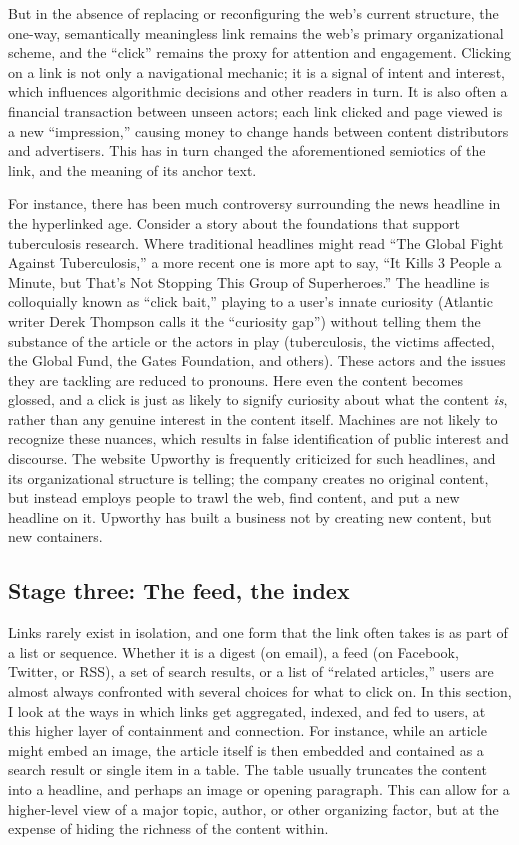 But in the absence of replacing or reconfiguring the web's current structure, the one-way, semantically meaningless link remains the web's primary organizational scheme, and the ``click'' remains the proxy for attention and engagement. Clicking on a link is not only a navigational mechanic; it is a signal of intent and interest, which influences algorithmic decisions and other readers in turn. It is also often a financial transaction between unseen actors; each link clicked and page viewed is a new ``impression,'' causing money to change hands between content distributors and advertisers. This has in turn changed the aforementioned semiotics of the link, and the meaning of its anchor text.

For instance, there has been much controversy surrounding the news headline in the hyperlinked age. Consider a story about the foundations that support tuberculosis research. Where traditional headlines might read ``The Global Fight Against Tuberculosis,'' a more recent one is more apt to say, ``It Kills 3 People a Minute, but That's Not Stopping This Group of Superheroes.''  The headline is colloquially known as ``click bait,'' playing to a user's innate curiosity (Atlantic writer Derek Thompson calls it the ``curiosity gap'')  without telling them the substance of the article or the actors in play (tuberculosis, the victims affected, the Global Fund, the Gates Foundation, and others). These actors and the issues they are tackling are reduced to pronouns. Here even the content becomes glossed, and a click is just as likely to signify curiosity about what the content \emph{is}, rather than any genuine interest in the content itself. Machines are not likely to recognize these nuances, which results in false identification of public interest and discourse. The website Upworthy is frequently criticized for such headlines, and its organizational structure is telling; the company creates no original content, but instead employs people to trawl the web, find content, and put a new headline on it. Upworthy has built a business not by creating new content, but new containers.

\subsection{Stage three: The feed, the index}

Links rarely exist in isolation, and one form that the link often takes is as part of a list or sequence. Whether it is a digest (on email), a feed (on Facebook, Twitter, or RSS), a set of search results, or a list of ``related articles,'' users are almost always confronted with several choices for what to click on. In this section, I look at the ways in which links get aggregated, indexed, and fed to users, at this higher layer of containment and connection. For instance, while an article might embed an image, the article itself is then embedded and contained as a search result or single item in a table. The table usually truncates the content into a headline, and perhaps an image or opening paragraph. This can allow for a higher-level view of a major topic, author, or other organizing factor, but at the expense of hiding the richness of the content within.

